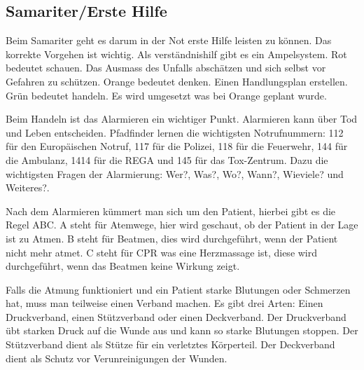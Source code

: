 \subsection*{Samariter/Erste Hilfe}
Beim Samariter geht es darum in der Not erste Hilfe leisten zu können. Das korrekte Vorgehen ist wichtig. Als verständnishilf gibt es ein Ampelsystem. Rot bedeutet schauen. Das Ausmass des Unfalls abschätzen und sich selbst vor Gefahren zu schützen. Orange bedeutet denken. Einen Handlungsplan erstellen. Grün bedeutet handeln. Es wird umgesetzt was bei Orange geplant wurde. \par
Beim Handeln ist das Alarmieren ein wichtiger Punkt. Alarmieren kann über Tod und Leben entscheiden. Pfadfinder lernen die wichtigsten Notrufnummern: 112 für den Europäischen Notruf, 117 für die Polizei, 118 für die Feuerwehr, 144 für die Ambulanz, 1414 für die REGA und 145 für das Tox-Zentrum. Dazu die wichtigsten Fragen der Alarmierung: Wer?, Was?, Wo?, Wann?, Wieviele? und Weiteres?. \par
Nach dem Alarmieren kümmert man sich um den Patient, hierbei gibt es die Regel ABC. A steht für Atemwege, hier wird geschaut, ob der Patient in der Lage ist zu Atmen. B steht für Beatmen, dies wird durchgeführt, wenn der Patient nicht mehr atmet. C steht für CPR was eine Herzmassage ist, diese wird durchgeführt, wenn das Beatmen keine Wirkung zeigt. \par
Falls die Atmung funktioniert und ein Patient starke Blutungen oder Schmerzen hat, muss man teilweise einen Verband machen. Es gibt drei Arten: Einen Druckverband, einen Stützverband oder einen Deckverband. Der Druckverband übt starken Druck auf die Wunde aus und kann so starke Blutungen stoppen. Der Stützverband dient als Stütze für ein verletztes Körperteil. Der Deckverband dient als Schutz vor Verunreinigungen der Wunden.

